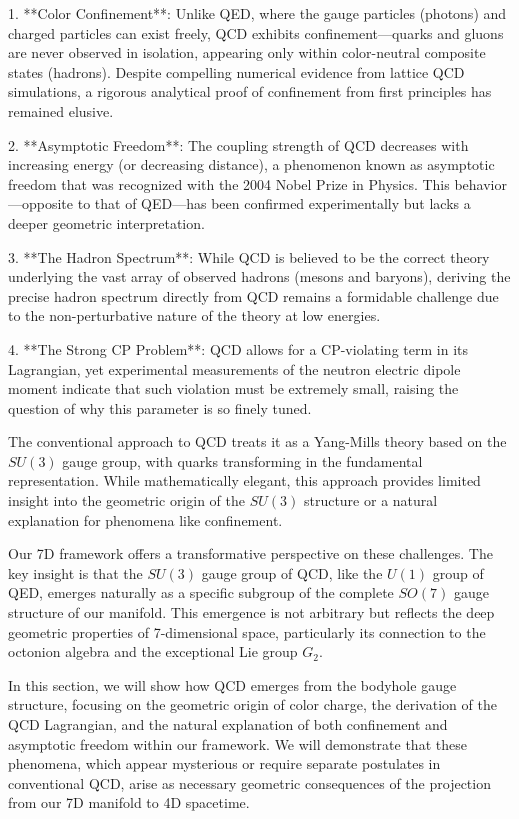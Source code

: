 \documentclass{article}
\begin{document}
1. **Color Confinement**: Unlike QED, where the gauge particles (photons) and charged particles can exist freely, QCD exhibits confinement—quarks and gluons are never observed in isolation, appearing only within color-neutral composite states (hadrons). Despite compelling numerical evidence from lattice QCD simulations, a rigorous analytical proof of confinement from first principles has remained elusive.

2. **Asymptotic Freedom**: The coupling strength of QCD decreases with increasing energy (or decreasing distance), a phenomenon known as asymptotic freedom that was recognized with the 2004 Nobel Prize in Physics. This behavior—opposite to that of QED—has been confirmed experimentally but lacks a deeper geometric interpretation.

3. **The Hadron Spectrum**: While QCD is believed to be the correct theory underlying the vast array of observed hadrons (mesons and baryons), deriving the precise hadron spectrum directly from QCD remains a formidable challenge due to the non-perturbative nature of the theory at low energies.

4. **The Strong CP Problem**: QCD allows for a CP-violating term in its Lagrangian, yet experimental measurements of the neutron electric dipole moment indicate that such violation must be extremely small, raising the question of why this parameter is so finely tuned.

The conventional approach to QCD treats it as a Yang-Mills theory based on the $SU(3)$ gauge group, with quarks transforming in the fundamental representation. While mathematically elegant, this approach provides limited insight into the geometric origin of the $SU(3)$ structure or a natural explanation for phenomena like confinement.

Our 7D framework offers a transformative perspective on these challenges. The key insight is that the $SU(3)$ gauge group of QCD, like the $U(1)$ group of QED, emerges naturally as a specific subgroup of the complete $SO(7)$ gauge structure of our manifold. This emergence is not arbitrary but reflects the deep geometric properties of 7-dimensional space, particularly its connection to the octonion algebra and the exceptional Lie group $G_2$.

In this section, we will show how QCD emerges from the bodyhole gauge structure, focusing on the geometric origin of color charge, the derivation of the QCD Lagrangian, and the natural explanation of both confinement and asymptotic freedom within our framework. We will demonstrate that these phenomena, which appear mysterious or require separate postulates in conventional QCD, arise as necessary geometric consequences of the projection from our 7D manifold to 4D spacetime.
\end{document}
